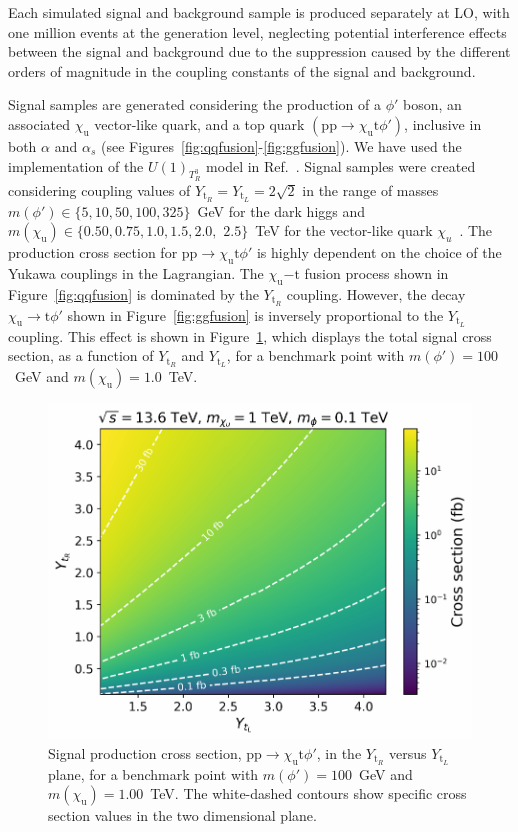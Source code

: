 Each simulated signal and background sample is produced separately at LO, with one million events at the generation level, neglecting potential interference effects between the signal and background due to the suppression caused by the different orders of magnitude in the coupling constants of the signal and background.

Signal samples are generated considering the production of a $\phi'$ boson, an associated $\chi_\mathrm{u}$ vector-like quark, and a top quark $(\mathrm{pp}\to \chi_\mathrm{u} \mathrm{t} \phi')$, inclusive in both $\alpha$ and $\alpha_s$ (see Figures~\ref{fig:qqfusion}-\ref{fig:ggfusion}). We have used the implementation of the $U(1)_{T^3_R}$ model in Ref.~\parencite{Dutta2023}. Signal samples were created considering coupling values of $Y_{\mathrm{t}_R}=Y_{\mathrm{t}_L}=2\sqrt{2}$ in the range of masses $m(\phi')\in\{5,10,50,100,325\}$~\textrm{GeV} for the dark higgs and $m(\chi_\mathrm{u})\in\{0.50, 0.75, 1.0, 1.5, 2.0, $ $ 2.5\}$~\textrm{TeV} for the vector-like quark $\chi_u$~\parencite{PhysRevD.108.095006}. The production cross section for $\mathrm{pp}\to \chi_\mathrm{u} \mathrm{t} \phi'$ is highly dependent on the choice of the Yukawa couplings in the Lagrangian. The ${\chi_\mathrm{u}}{- \mathrm{t}}$ fusion process shown in Figure~\ref{fig:qqfusion} is dominated by the $Y_{\mathrm{t}_R}$ coupling. However, the decay ${\chi_\mathrm{u}} \to \mathrm{t} \phi'$ shown in Figure~\ref{fig:ggfusion} is inversely proportional to the $Y_{\mathrm{t}_L}$ coupling. This effect is shown in Figure~\ref{fig:cross_section_by_lambdas}, which displays the total signal cross section, as a function of $Y_{\mathrm{t}_R}$ and $Y_{\mathrm{t}_L}$, for a benchmark point with $m(\phi')=100$~\textrm{GeV} and $m(\chi_\mathrm{u})=1.0$~\textrm{TeV}. 

\begin{figure}
    \centering
    \includegraphics[width=0.85\linewidth]{Images/cross_section_by_lambdas.pdf}
    \caption{Signal production cross section, $ \mathrm{pp}\to \chi_\mathrm{u} \mathrm{t} \phi'$,  in the $Y_{\mathrm{t}_R}$ versus $Y_{\mathrm{t}_L}$ plane, for a benchmark point with $m(\phi')=100$~\textrm{GeV} and $m(\chi_\mathrm{u})=1.00$~\textrm{TeV}. The white-dashed contours show specific cross section values in the two dimensional plane.}
    \label{fig:cross_section_by_lambdas}
\end{figure}

